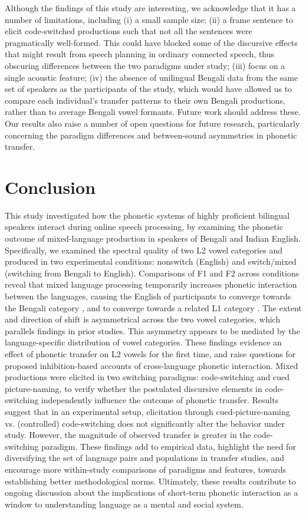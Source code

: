\documentclass[12 pt]{article}
\newcommand{\nt}[1]{\textipa{[#1]}} %
\begin{document}
Although the findings of this study are interesting, we acknowledge that it has a number of limitations, including (i) a small sample size; (ii) a frame sentence to elicit code-switched productions such that not all the sentences were pragmatically well-formed. This could have blocked some of the discursive effects that might result from speech planning in ordinary connected speech, thus obscuring differences between the two paradigms under study; (iii) focus on a single acoustic feature; (iv) the absence of unilingual Bengali data from the same set of speakers as the participants of the study, which would have allowed us to compare each individual's transfer patterns to their own Bengali productions, rather than to average Bengali vowel formants. Future work should address these. Our results also raise a number of open questions for future research, particularly concerning the paradigm differences and between-sound asymmetries in phonetic transfer.   


\section{Conclusion}
This study investigated how the phonetic systems of highly proficient bilingual speakers interact during online speech processing, by examining the phonetic outcome of mixed-language production in speakers of Bengali and Indian English. Specifically, we examined the spectral quality of two L2 vowel categories \nt{2} and \nt{\ae} produced in two experimental conditions: nonswitch (English) and switch/mixed (switching from Bengali to English).
Comparisons of F1 and F2 across conditions reveal that mixed language processing temporarily increases phonetic interaction between the languages, causing the English \nt{\ae} of participants to converge towards the Bengali category \nt{\ae}, and \nt{2} to converge towards a related L1 category \nt{a:}. The extent and direction of shift is asymmetrical across the two vowel categories, which parallels findings in prior studies. This asymmetry appears to be mediated by the language-specific distribution of vowel categories. These findings evidence an effect of phonetic transfer on L2 vowels for the first time, and raise questions for proposed inhibition-based accounts of cross-language phonetic interaction. Mixed productions were elicited in two switching paradigms: code-switching and cued picture-naming, to verify whether the postulated discursive elements in code-switching independently influence the outcome of phonetic transfer. Results suggest that in an experimental setup, elicitation through cued-picture-naming vs. (controlled) code-switching does not significantly alter the behavior under study. However, the magnitude of observed transfer is greater in the code-switching paradigm. These findings add to empirical data, highlight the need for diversifying the set of language pairs and populations in transfer studies, and encourage more within-study comparisons of paradigms and features, towards establishing better methodological norms. Ultimately, these results contribute to ongoing discussion about the implications of short-term phonetic interaction as a window to understanding language as a mental and social system.
\end{document}
